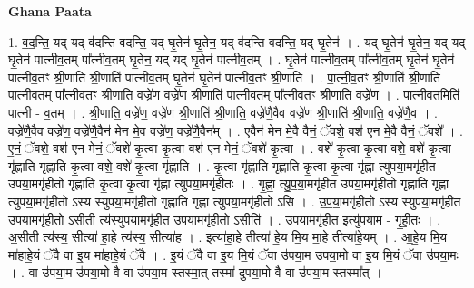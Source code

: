\documentclass[17pt]{extarticle}
\begin{document}
\textbf{Ghana Paata } \newline

1. व॒द॒न्ति॒ यद् यद् व॑दन्ति वदन्ति॒ यद् घृ॒तेन॑ घृ॒तेन॒ यद् व॑दन्ति वदन्ति॒ यद् घृ॒तेन॑ । . यद् घृ॒तेन॑ घृ॒तेन॒ यद् यद् घृ॒तेन॑ पात्नीव॒तम् पा᳚त्नीव॒तम् घृ॒तेन॒ यद् यद् घृ॒तेन॑ पात्नीव॒तम् । . घृ॒तेन॑ पात्नीव॒तम् पा᳚त्नीव॒तम् घृ॒तेन॑ घृ॒तेन॑ पात्नीव॒तꣳ श्री॒णाति॑ श्री॒णाति॑ पात्नीव॒तम् घृ॒तेन॑ घृ॒तेन॑ पात्नीव॒तꣳ श्री॒णाति॑ । . पा॒त्नी॒व॒तꣳ श्री॒णाति॑ श्री॒णाति॑ पात्नीव॒तम् पा᳚त्नीव॒तꣳ श्री॒णाति॒ वज्रे॑ण॒ वज्रे॑ण श्री॒णाति॑ पात्नीव॒तम् पा᳚त्नीव॒तꣳ श्री॒णाति॒ वज्रे॑ण । . पा॒त्नी॒व॒तमिति॑ पात्नी - व॒तम् । . श्री॒णाति॒ वज्रे॑ण॒ वज्रे॑ण श्री॒णाति॑ श्री॒णाति॒ वज्रे॑णै॒वैव वज्रे॑ण श्री॒णाति॑ श्री॒णाति॒ वज्रे॑णै॒व । . वज्रे॑णै॒वैव वज्रे॑ण॒ वज्रे॑णै॒वैन॑ मेन मे॒व वज्रे॑ण॒ वज्रे॑णै॒वैन᳚म् । . ए॒वैन॑ मेन मे॒वै वैनं॒ ॅवशे॒ वश॑ एन मे॒वै वैनं॒ ॅवशे᳚ । . ए॒नं॒ ॅवशे॒ वश॑ एन मेनं॒ ॅवशे॑ कृ॒त्वा कृ॒त्वा वश॑ एन मेनं॒ ॅवशे॑ कृ॒त्वा । . वशे॑ कृ॒त्वा कृ॒त्वा वशे॒ वशे॑ कृ॒त्वा गृ॑ह्णाति गृह्णाति कृ॒त्वा वशे॒ वशे॑ कृ॒त्वा गृ॑ह्णाति । . कृ॒त्वा गृ॑ह्णाति गृह्णाति कृ॒त्वा कृ॒त्वा गृ॑ह्णा त्युपया॒मगृ॑हीत उपया॒मगृ॑हीतो गृह्णाति कृ॒त्वा कृ॒त्वा गृ॑ह्णा त्युपया॒मगृ॑हीतः । . गृ॒ह्णा॒ त्यु॒प॒या॒मगृ॑हीत उपया॒मगृ॑हीतो गृह्णाति गृह्णा त्युपया॒मगृ॑हीतो ऽस्य स्युपया॒मगृ॑हीतो गृह्णाति गृह्णा त्युपया॒मगृ॑हीतो ऽसि । . उ॒प॒या॒मगृ॑हीतो ऽस्य स्युपया॒मगृ॑हीत उपया॒मगृ॑हीतो॒ ऽसीती त्य॑स्युपया॒मगृ॑हीत उपया॒मगृ॑हीतो॒ ऽसीति॑ । . उ॒प॒या॒मगृ॑हीत॒ इत्यु॑पया॒म - गृ॒ही॒तः॒ । . अ॒सीती त्य॑स्य॒ सीत्या॑ हा॒हे त्य॑स्य॒ सीत्या॑ह । . इत्या॑हा॒हे तीत्या॑ हे॒य मि॒य मा॒हे तीत्या॑हे॒यम् । . आ॒हे॒य मि॒य मा॑हाहे॒यं ॅवै वा इ॒य मा॑हाहे॒यं ॅवै । . इ॒यं ॅवै वा इ॒य मि॒यं ॅवा उ॑पया॒म उ॑पया॒मो वा इ॒य मि॒यं ॅवा उ॑पया॒मः । . वा उ॑पया॒म उ॑पया॒मो वै वा उ॑पया॒म स्तस्मा॒त् तस्मा॑ दुपया॒मो वै वा उ॑पया॒म स्तस्मा᳚त् । \newline
\end{document}
